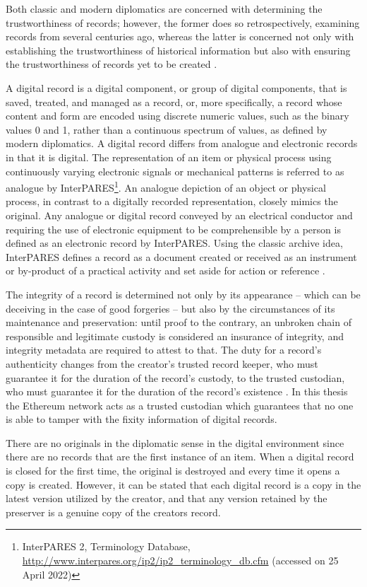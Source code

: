 \documentclass[final]{vutinfth}
\begin{document}
Both classic and modern diplomatics are concerned with determining the trustworthiness of records; however, the former does so retrospectively, examining records from several centuries ago, whereas the latter is concerned not only with establishing the trustworthiness of historical information but also with ensuring the trustworthiness of records yet to be created \cite[10]{kirschenbaum2010digital}. 

A digital record is a digital component, or group of digital components, that is saved, treated, and managed as a record, or, more specifically, a record whose content and form are encoded using discrete numeric values, such as the binary values 0 and 1, rather than a continuous spectrum of values, as defined by modern diplomatics. A digital record differs from analogue and electronic records in that it is digital. The representation of an item or physical process using continuously varying electronic signals or mechanical patterns is referred to as analogue by InterPARES\footnote{InterPARES 2, Terminology Database, \url{http://www.interpares.org/ip2/ip2_terminology_db.cfm} (accessed on 25 April 2022)}.
An analogue depiction of an object or physical process, in contrast to a digitally recorded representation, closely mimics the original. Any analogue or digital record conveyed by an electrical conductor and requiring the use of electronic equipment to be comprehensible by a person is defined as an electronic record by InterPARES. Using the classic archive idea, InterPARES defines a record as a document created or received as an instrument or by-product of a practical activity and set aside for action or reference \cite[44]{duranti2009digital}.

The integrity of a record is determined not only by its appearance – which can be deceiving in the case of good forgeries – but also by the circumstances of its maintenance and preservation: until proof to the contrary, an unbroken chain of responsible and legitimate custody is considered an insurance of integrity, and integrity metadata are required to attest to that. The duty for a record's authenticity changes from the creator's trusted record keeper, who must guarantee it for the duration of the record's custody, to the trusted custodian, who must guarantee it for the duration of the record's existence \cite[53]{duranti2009digital}. In this thesis the Ethereum network acts as a trusted custodian which guarantees that no one is able to tamper with the fixity information of digital records.

There are no originals in the diplomatic sense in the digital environment since there are no records that are the first instance of an item. When a digital record is closed for the first time, the original is destroyed and every time it opens a copy is created. However, it can be stated that each digital record is a copy in the latest version utilized by the creator, and that any version retained by the preserver is a genuine copy of the creators record.
\end{document}
